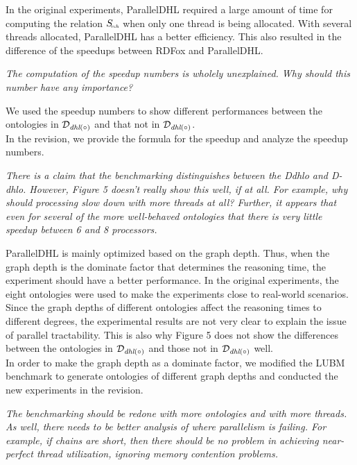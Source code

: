 \documentclass{article}
\let\quoteOld\quote
\let\endquoteOld\endquote
\renewenvironment{quote}{\quoteOld\itshape}{\endquoteOld}
\begin{document}
In the original experiments, ParallelDHL required a large amount of time for computing
the relation $S_{\textit{\!\tiny rch}}$ when only one thread is being allocated.
With several threads allocated, ParallelDHL has a better efficiency.
This also resulted in the difference of the speedups between RDFox and ParallelDHL.


\begin{quote}
The computation of the speedup numbers is wholely unexplained.  Why should
this number have any importance?
\end{quote}


We used the speedup numbers to show different performances between the
ontologies in $\mathcal{D}_{\textit{\text{dhl}}(\circ)}$ and
that not in $\mathcal{D}_{\textit{\text{dhl}}(\circ)}$.\\

In the revision, we provide the formula for the speedup and analyze
the speedup numbers.


\begin{quote}
There is a claim that the benchmarking distinguishes between the Ddhlo and
D-dhlo.  However, Figure 5 doesn't really show this well, if at all.   For
example, why should processing slow down with more threads at all?  Further,
it appears that even for several of the more well-behaved ontologies that there
is very little speedup between 6 and 8 processors.
\end{quote}


ParallelDHL is mainly
optimized based on the graph depth. Thus, when the graph depth is the
dominate factor that determines the reasoning time, the experiment 
should have a better performance. 
In the original experiments, the eight ontologies were used to make
the experiments close to real-world scenarios.
Since the graph depths of different ontologies affect the reasoning times
to different degrees, the experimental results are not very clear
to explain the issue of parallel tractability.
This is also why
Figure 5 does not show the differences between the ontologies in
$\mathcal{D}_{\textit{\text{dhl}}(\circ)}$ and those not in
$\mathcal{D}_{\textit{\text{dhl}}(\circ)}$ well.\\

In order to make the graph depth as a dominate factor, we modified the LUBM benchmark to 
generate ontologies of different graph depths and conducted the new experiments
in the revision.



\begin{quote}
The benchmarking should be redone with more ontologies and with more
threads.  As well, there needs to be better analysis of where parallelism is
failing.  For example, if chains are short, then there should be no problem
in achieving near-perfect thread utilization, ignoring memory contention
problems.
\end{quote}
\end{document}
